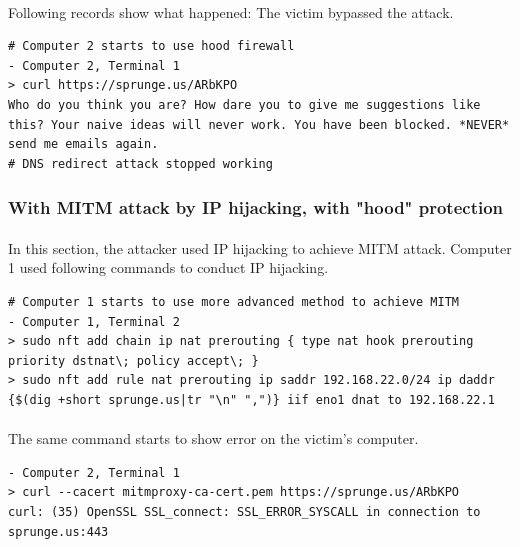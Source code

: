 \documentclass[mscthesis]{usiinfthesis}
\begin{document}
\paragraph{}
Following records show what happened: The victim bypassed the attack.
\begin{lstlisting}[language={},frame=single,breaklines=true,postbreak=\mbox{\textcolor{red}{$\hookrightarrow$}\space}]
# Computer 2 starts to use hood firewall
- Computer 2, Terminal 1
> curl https://sprunge.us/ARbKPO
Who do you think you are? How dare you to give me suggestions like this? Your naive ideas will never work. You have been blocked. *NEVER* send me emails again.
# DNS redirect attack stopped working
\end{lstlisting}

\subsubsection{With MITM attack by IP hijacking, with "hood" protection}
\paragraph{}
In this section, the attacker used IP hijacking to achieve MITM attack. Computer 1 used following commands to conduct IP hijacking.

\begin{lstlisting}[language={},frame=single,breaklines=true,postbreak=\mbox{\textcolor{red}{$\hookrightarrow$}\space}]
# Computer 1 starts to use more advanced method to achieve MITM
- Computer 1, Terminal 2
> sudo nft add chain ip nat prerouting { type nat hook prerouting priority dstnat\; policy accept\; }
> sudo nft add rule nat prerouting ip saddr 192.168.22.0/24 ip daddr {$(dig +short sprunge.us|tr "\n" ",")} iif eno1 dnat to 192.168.22.1
\end{lstlisting}

\paragraph{}
The same command starts to show error on the victim's computer.
\begin{lstlisting}[language={},frame=single,breaklines=true,postbreak=\mbox{\textcolor{red}{$\hookrightarrow$}\space}]
- Computer 2, Terminal 1
> curl --cacert mitmproxy-ca-cert.pem https://sprunge.us/ARbKPO
curl: (35) OpenSSL SSL_connect: SSL_ERROR_SYSCALL in connection to sprunge.us:443
\end{lstlisting}
\end{document}
